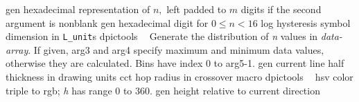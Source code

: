 %
  {gen}%
  {hexadecimal representation of $n,$ left padded to $m$ digits if the second
   argument is nonblank}%
%
  {gen}%
  {hexadecimal digit for $0 \leq n < 16$}%
%
  {log}%
  {hysteresis symbol dimension in {\tt L\_unit}s}%
%
  {dpictools}%
  {$\;\;$ Generate the distribution of {\sl n} values in {\sl data-array}.
    If given, arg3 and arg4 specify maximum and minimum data values,
    otherwise they are calculated. Bins have index 0 to arg5-1.}%
%
  {gen}%
  {current line half thickness in drawing units}%
%
  {cct}%
  {hop radius in crossover macro}%
%
  {dpictools}%
  {$\;\;$ hsv color triple to rgb; {\sl h} has range 0 to 360.}%
%
  {gen}%
  {height relative to current direction}%

%

